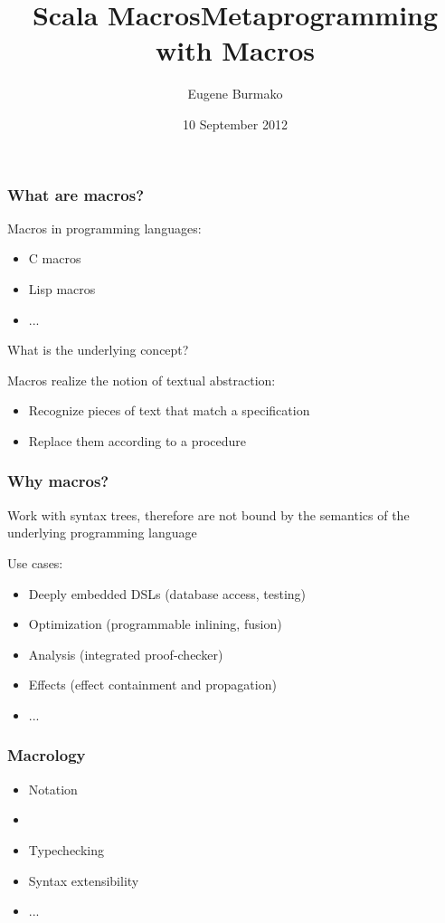 \documentclass[hyperref={bookmarks=false}]{beamer}
\title{Scala Macros}
\begin{document}
\title{Metaprogramming with Macros}
\author{Eugene Burmako}
\date{10 September 2012}
{
\begin{frame}
  \titlepage
\end{frame}
}

\begin{frame}[fragile]
\frametitle{What are macros?}
Macros in programming languages:
\begin{itemize}
\item C macros
\item Lisp macros
\item ...
\end{itemize}

\vskip25pt
What is the underlying concept?
\vskip25pt
\pause

Macros realize the notion of textual abstraction:
\begin{itemize}
\item Recognize pieces of text that match a specification
\item Replace them according to a procedure
\end{itemize}
\end{frame}

\begin{frame}[fragile]
\frametitle{Why macros?}

Work with syntax trees, therefore are not bound by the semantics of the underlying
programming language

Use cases:
\begin{itemize}
\item Deeply embedded DSLs (database access, testing)
\item Optimization (programmable inlining, fusion)
\item Analysis (integrated proof-checker)
\item Effects (effect containment and propagation)
\item ...
\end{itemize}
\end{frame}

\begin{frame}[fragile]
\frametitle{Macrology}
\begin{itemize}
\item Notation
\item \text{\color{blue}{Bindings}}
\item Typechecking
\item Syntax extensibility
\item ...
\end{itemize}
\end{frame}
\end{document}
